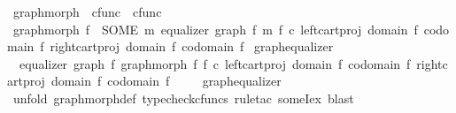 \begin{isabellebody}
\endisatagproof
{\isafoldproof}%
%
\isadelimproof
\isanewline
%
\endisadelimproof
\isanewline
{}\isamarkupfalse%
\ graph{\isacharunderscore}{\kern0pt}morph\ {\isacharcolon}{\kern0pt}{\isacharcolon}{\kern0pt}\ {\isachardoublequoteopen}cfunc\ {\isasymRightarrow}\ cfunc{\isachardoublequoteclose}\ \isanewline
\ {\isachardoublequoteopen}graph{\isacharunderscore}{\kern0pt}morph\ f\ {\isacharequal}{\kern0pt}\ {\isacharparenleft}{\kern0pt}SOME\ m{\isachardot}{\kern0pt}\ equalizer\ {\isacharparenleft}{\kern0pt}graph\ f{\isacharparenright}{\kern0pt}\ m\ {\isacharparenleft}{\kern0pt}f\ {\isasymcirc}\isactrlsub c\ left{\isacharunderscore}{\kern0pt}cart{\isacharunderscore}{\kern0pt}proj\ {\isacharparenleft}{\kern0pt}domain\ f{\isacharparenright}{\kern0pt}\ {\isacharparenleft}{\kern0pt}codomain\ f{\isacharparenright}{\kern0pt}{\isacharparenright}{\kern0pt}\ {\isacharparenleft}{\kern0pt}right{\isacharunderscore}{\kern0pt}cart{\isacharunderscore}{\kern0pt}proj\ {\isacharparenleft}{\kern0pt}domain\ f{\isacharparenright}{\kern0pt}\ {\isacharparenleft}{\kern0pt}codomain\ f{\isacharparenright}{\kern0pt}{\isacharparenright}{\kern0pt}{\isacharparenright}{\kern0pt}{\isachardoublequoteclose}\isanewline
\isanewline
{}\isamarkupfalse%
\ graph{\isacharunderscore}{\kern0pt}equalizer{}{\isacharcolon}{\kern0pt}\isanewline
\ \ {\isachardoublequoteopen}equalizer\ {\isacharparenleft}{\kern0pt}graph\ f{\isacharparenright}{\kern0pt}\ {\isacharparenleft}{\kern0pt}graph{\isacharunderscore}{\kern0pt}morph\ f{\isacharparenright}{\kern0pt}\ {\isacharparenleft}{\kern0pt}f\ {\isasymcirc}\isactrlsub c\ left{\isacharunderscore}{\kern0pt}cart{\isacharunderscore}{\kern0pt}proj\ {\isacharparenleft}{\kern0pt}domain\ f{\isacharparenright}{\kern0pt}\ {\isacharparenleft}{\kern0pt}codomain\ f{\isacharparenright}{\kern0pt}{\isacharparenright}{\kern0pt}\ {\isacharparenleft}{\kern0pt}right{\isacharunderscore}{\kern0pt}cart{\isacharunderscore}{\kern0pt}proj\ {\isacharparenleft}{\kern0pt}domain\ f{\isacharparenright}{\kern0pt}\ {\isacharparenleft}{\kern0pt}codomain\ f{\isacharparenright}{\kern0pt}{\isacharparenright}{\kern0pt}{\isachardoublequoteclose}\isanewline
%
\isadelimproof
\ \ \ %
\endisadelimproof
%
\isatagproof
{}\isamarkupfalse%
\ graph{\isacharunderscore}{\kern0pt}equalizer\ \isamarkupfalse%
\ {\isacharparenleft}{\kern0pt}unfold\ graph{\isacharunderscore}{\kern0pt}morph{\isacharunderscore}{\kern0pt}def{\isacharcomma}{\kern0pt}\ typecheck{\isacharunderscore}{\kern0pt}cfuncs{\isacharcomma}{\kern0pt}\ rule{\isacharunderscore}{\kern0pt}tac\ someI{\isacharunderscore}{\kern0pt}ex{\isacharcomma}{\kern0pt}\ blast{\isacharparenright}{\kern0pt}%

\end{isabellebody}
